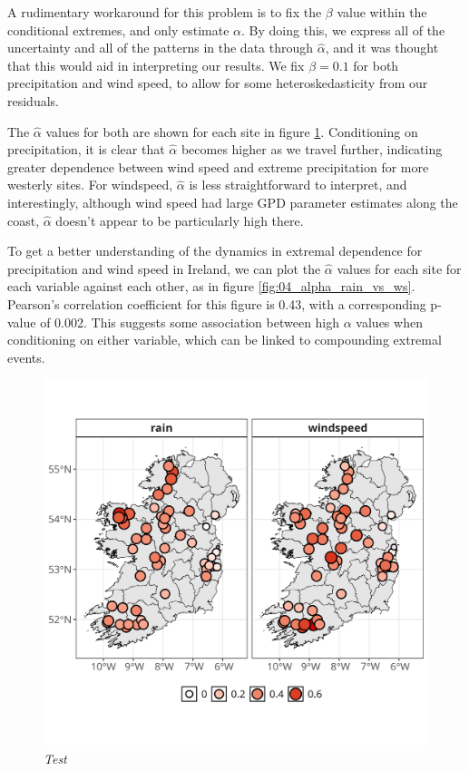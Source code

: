 \documentclass{article}
\numberwithin{equation}{section}
\begin{document}
A rudimentary workaround for this problem is to fix the $\beta$ value within the conditional extremes, and only estimate $\alpha$.
By doing this, we express all of the uncertainty and all of the patterns in the data through $\hat{\alpha}$, and it was thought that this would aid in interpreting our results.
We fix $\beta = 0.1$ for both precipitation and wind speed, to allow for some heteroskedasticity from our residuals.

The $\hat{\alpha}$ values for both are shown for each site in figure \ref{fig:04_alpha_map}.
Conditioning on precipitation, it is clear that $\hat{\alpha}$ becomes higher as we travel further, indicating greater dependence between wind speed and extreme precipitation for more westerly sites. 
For windspeed, $\hat{\alpha}$ is less straightforward to interpret, and interestingly, although wind speed had large GPD parameter estimates along the coast, $\hat{\alpha}$ doesn't appear to be particularly high there. 

To get a better understanding of the dynamics in extremal dependence for precipitation and wind speed in Ireland, we can plot the $\hat{\alpha}$ values for each site for each variable against each other, as in figure \ref{fig:04_alpha_rain_vs_ws}.
Pearson's correlation coefficient for this figure is 0.43, with a corresponding p-value of 0.002. 
This suggests some association between high $\alpha$ values when conditioning on either variable, which can be linked to compounding extremal events.

\begin{figure}[H]
    \centering
    \includegraphics[width = 0.9\linewidth]{plots/045_alpha_map.png}
    \caption{\emph{Test}}
    \label{fig:04_alpha_map}
\end{figure}
\end{document}
